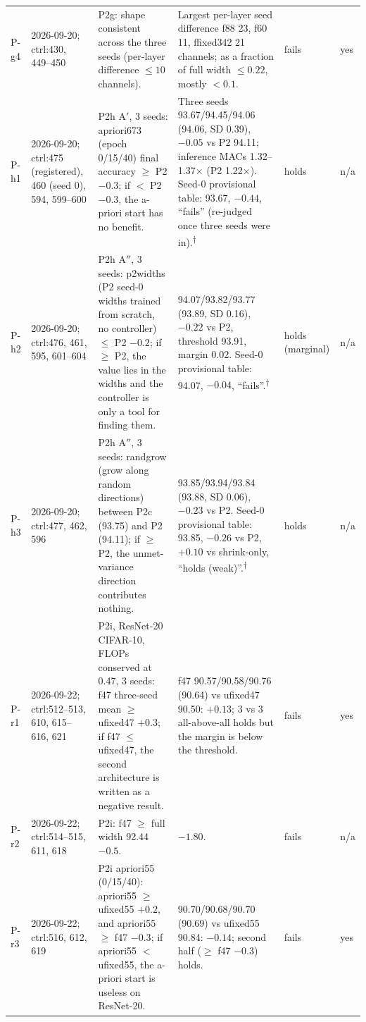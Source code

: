 \begin{longtable}{p{1.1cm}p{1.4cm}p{6.2cm}p{4.6cm}p{2.0cm}p{1.6cm}}
P-g4 & 2026-09-20; ctrl:430, 449--450 & P2g: shape consistent across the three seeds (per-layer difference $\le 10$ channels). & Largest per-layer seed difference f88 23, f60 11, ffixed342 21 channels; as a fraction of full width $\le 0.22$, mostly $< 0.1$. & fails & yes \\
P-h1 & 2026-09-20; ctrl:475 (registered), 460 (seed 0), 594, 599--600 & P2h A$'$, 3 seeds: apriori673 (epoch 0/15/40) final accuracy $\ge$ P2 $- 0.3$; if $<$ P2 $- 0.3$, the a-priori start has no benefit. & Three seeds 93.67/94.45/94.06 (94.06, SD 0.39), $-0.05$ vs P2 94.11; inference MACs 1.32--1.37$\times$ (P2 1.22$\times$). Seed-0 provisional table: 93.67, $-0.44$, ``fails'' (re-judged once three seeds were in).\textsuperscript{$\dagger$} & holds & n/a \\
P-h2 & 2026-09-20; ctrl:476, 461, 595, 601--604 & P2h A$''$, 3 seeds: p2widths (P2 seed-0 widths trained from scratch, no controller) $\le$ P2 $- 0.2$; if $\ge$ P2, the value lies in the widths and the controller is only a tool for finding them. & 94.07/93.82/93.77 (93.89, SD 0.16), $-0.22$ vs P2, threshold 93.91, margin 0.02. Seed-0 provisional table: 94.07, $-0.04$, ``fails''.\textsuperscript{$\dagger$} & holds (marginal) & n/a \\
P-h3 & 2026-09-20; ctrl:477, 462, 596 & P2h A$''$, 3 seeds: randgrow (grow along random directions) between P2c (93.75) and P2 (94.11); if $\ge$ P2, the unmet-variance direction contributes nothing. & 93.85/93.94/93.84 (93.88, SD 0.06), $-0.23$ vs P2. Seed-0 provisional table: 93.85, $-0.26$ vs P2, $+0.10$ vs shrink-only, ``holds (weak)''.\textsuperscript{$\dagger$} & holds & n/a \\
P-r1 & 2026-09-22; ctrl:512--513, 610, 615--616, 621 & P2i, ResNet-20 CIFAR-10, FLOPs conserved at 0.47, 3 seeds: f47 three-seed mean $\ge$ ufixed47 $+ 0.3$; if f47 $\le$ ufixed47, the second architecture is written as a negative result. & f47 90.57/90.58/90.76 (90.64) vs ufixed47 90.50: $+0.13$; 3 vs 3 all-above-all holds but the margin is below the threshold. & fails & yes \\
P-r2 & 2026-09-22; ctrl:514--515, 611, 618 & P2i: f47 $\ge$ full width 92.44 $- 0.5$. & $-1.80$. & fails & n/a \\
P-r3 & 2026-09-22; ctrl:516, 612, 619 & P2i apriori55 (0/15/40): apriori55 $\ge$ ufixed55 $+ 0.2$, and apriori55 $\ge$ f47 $- 0.3$; if apriori55 $<$ ufixed55, the a-priori start is useless on ResNet-20. & 90.70/90.68/90.70 (90.69) vs ufixed55 90.84: $-0.14$; second half ($\ge$ f47 $- 0.3$) holds. & fails & yes \\

\end{longtable}
